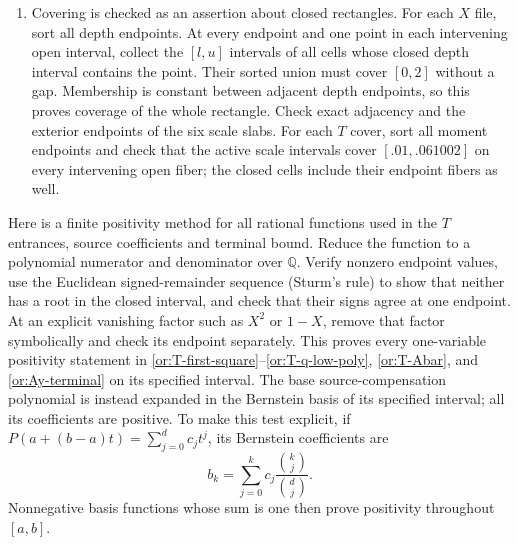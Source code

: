 \begin{enumerate}
  lower-minus-upper reserve.  Each depth cell must have its rounded lower depth strictly
  greater than $t_+$.  Each low-field exclusion must have $H\ge600$.
  Each pair cell must satisfy $0<r<1$, $R>0$, $0<m<1$, $\delta>0$, $I_\Sigma>0$,
  both inset gates, both endpoint chord inequalities, its squared
  radical enclosure, and the strict
  comparison \eqref{or:pair-lower}--\eqref{or:T-pair-upper}.
\item Covering is checked as an assertion about closed rectangles.
  For each $X$ file, sort all depth endpoints.  At every endpoint
  and one point in each intervening open interval, collect the
  $[l,u]$ intervals of all cells whose closed depth interval contains
  the point.  Their sorted union must cover $[0,2]$ without a gap.
  Membership is constant between adjacent depth endpoints, so this
  proves coverage of the whole rectangle.  Check exact adjacency
  and the exterior endpoints of the six scale slabs.  For each
  $T$ cover, sort all moment endpoints and check that the active
  scale intervals cover $[.01,.061002]$ on every intervening open
  fiber; the closed cells include their endpoint fibers as well.
\end{enumerate}

Here is a finite positivity method for all rational functions used in
the $T$ entrances, source coefficients and terminal bound.  Reduce the
function to a polynomial numerator and denominator over $\mathbb Q$.
Verify nonzero endpoint values, use the Euclidean signed-remainder
sequence (Sturm's rule) to show that neither has a root in the closed
interval, and check that their signs agree at one endpoint.  At an
explicit vanishing factor such as $X^2$ or $1-X$, remove that factor
symbolically and check its endpoint separately.  This proves every
one-variable positivity statement in
\eqref{or:T-first-square}--\eqref{or:T-q-low-poly},
\eqref{or:T-Abar}, and \eqref{or:Ay-terminal} on its specified
interval.  The base source-compensation polynomial is instead
expanded in the Bernstein basis of its specified interval; all its
coefficients are positive.  To make this test explicit, if
$P(a+(b-a)t)=\sum_{j=0}^d c_jt^j$, its Bernstein coefficients are
\[
                   b_k=\sum_{j=0}^k c_j
                                   \frac{\binom{k}{j}}{\binom{d}{j}}.
\]
Nonnegative basis functions whose sum is one then prove positivity
throughout $[a,b]$.

